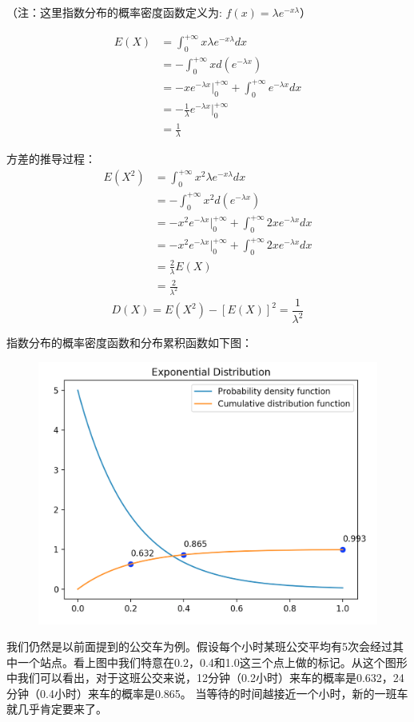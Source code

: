\documentclass[12pt]{article}
\begin{document}
（注：这里指数分布的概率密度函数定义为: $f(x) = {\lambda}e^{-{x}{\lambda}}$）

\begin{align}
E(X) &= \int_0^{+\infty}x{\lambda}e^{-{x}{\lambda}}dx \\
&= -\int_0^{+\infty}xd(e^{-\lambda x}) \\
&= -xe^{-\lambda x}\big|_0^{+\infty} + \int_0^{+\infty} e^{-\lambda x}dx \\
&= -\frac{1}{\lambda}e^{-\lambda x}\big|_0^{+\infty} \\
&= \frac{1}{\lambda}
\end{align}

方差的推导过程：
\begin{align}
E(X^2) &= \int_0^{+\infty}x^2{\lambda}e^{-{x}{\lambda}}dx \\
&= -\int_0^{+\infty}x^2d(e^{-\lambda x}) \\
&= -x^2e^{-\lambda x}\big|_0^{+\infty} + \int_0^{+\infty}2x e^{-\lambda x}dx \\
&= -x^2e^{-\lambda x}\big|_0^{+\infty} + \int_0^{+\infty}2x e^{-\lambda x}dx \\
&= \frac{2}{\lambda} E(X) \\
&= \frac{2}{\lambda^2}
\end{align}
$$
D(X) = E(X^2) - [E(X)]^2 = \frac{1}{\lambda^2}
$$


指数分布的概率密度函数和分布累积函数如下图：
\begin{figure}[H]
  \centering
  \includegraphics[width=.8\textwidth]{fig/expon_dist.png} 
\end{figure}

我们仍然是以前面提到的公交车为例。假设每个小时某班公交平均有5次会经过其中一个站点。看上图中我们特意在0.2，0.4和1.0这三个点上做的标记。从这个图形中我们可以看出，对于这班公交来说，12分钟（0.2小时）来车的概率是0.632，24分钟（0.4小时）来车的概率是0.865。 当等待的时间越接近一个小时，新的一班车就几乎肯定要来了。
\end{document}
